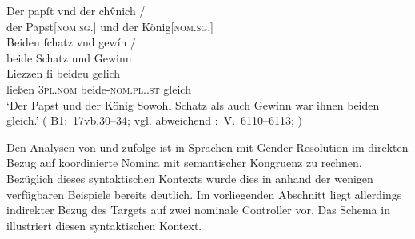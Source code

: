 \begin{exe}
\ex\label{ex:papstkoenig5} %
	\gll Der papſt vnd der chv̂nich {/} \\
		der Papst[\textsc{nom.sg.\MascM}] und der König[\textsc{nom.sg.\MascM}]
		\\
	\textelp{}
	\gll Beideu ſchatz vnd gewín {/} \\
		beide Schatz und Gewinn \\
	\gll Liezzen ſi beideu gelich \\
		ließen \textsc{3pl\subM.nom} beide-\textsc{nom.pl.\NeutM.st} gleich \\
	\trans `Der Papst und der König
		\textelp{}
		Sowohl Schatz als auch Gewinn war ihnen beiden gleich.'
		(%
			B1:~17vb,30--34; vgl. abweichend
			\KC:~V.~6110--6113;
			\cite[202]{schroeder1895}%
		)
\end{exe}

Den Analysen von \citet{wechsler2009} und \citet{wechslerzlatic2003} zufolge
ist in Sprachen mit Gender Resolution im direkten Bezug auf koordinierte Nomina
mit semantischer Kongruenz zu rechnen. Bezüglich dieses syntaktischen Kontexts
wurde dies in  anhand der wenigen verfügbaren Beispiele
bereits deutlich. Im vorliegenden Abschnitt liegt allerdings indirekter Bezug
des Targets  auf zwei nominale Controller vor. Das Schema in
 illustriert diesen syntaktischen Kontext.

